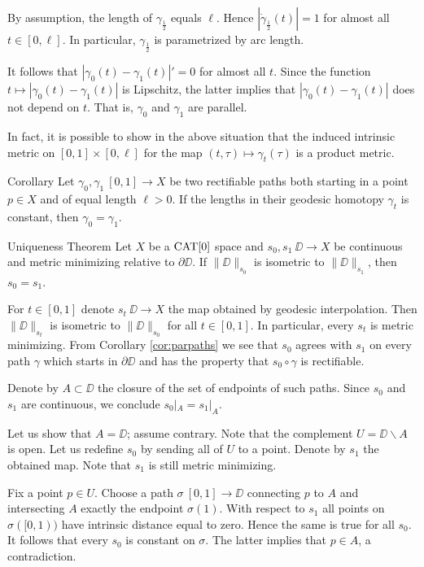 \documentclass{article}
\begin{document}
By assumption, the length of $\gamma_{\frac12}$ equals $\ell$. 
Hence $|\dot\gamma_{\frac12}(t)|=1$ for almost all $t\in[0,\ell]$. 
In particular, $\gamma_{\frac12}$
is parametrized by arc length. 

It follows that $|\gamma_{0}(t)-\gamma_{1}(t)|'=0$ for almost all $t$.
Since the function $t\mapsto |\gamma_{0}(t)-\gamma_{1}(t)|$ is Lipschitz,
the latter  implies that $|\gamma_{0}(t)-\gamma_{1}(t)|$ does not depend on $t$.
That is, $\gamma_{0}$ and $\gamma_{1}$ are parallel.
\qeds

In fact, it is possible to show in the above situation that the induced intrinsic metric on $[0,1]\times[0,\ell]$
for the map $(t,\tau)\mapsto \gamma_t(\tau)$ is a product metric.

\begin{thm}{Corollary}\label{cor:parpaths}
Let $\gamma_0,\gamma_1\:[0,1]\to X$ be two rectifiable paths both starting in a point $p\in X$ and of equal length $\ell>0$. 
If the lengths in their geodesic homotopy $\gamma_t$ is constant, then $\gamma_{0}=\gamma_{1}$.
\end{thm}

\begin{thm}{Uniqueness Theorem}\label{prop:strict-mm}
Let $X$ be a $\mathop{\rm CAT}\nolimits[0]$ space and $s_0, s_1\:\DD\to X$ be continuous and metric minimizing relative to $\partial\DD$. 
If 
$\|\DD\|_{s_0}$ is isometric to $\|\DD\|_{s_1}$, then $s_0=s_1$.
\end{thm}

For $t\in[0,1]$ denote $s_t\:\DD\to X$ the map obtained by geodesic interpolation. 
Then
$\|\DD\|_{s_t}$ is isometric to $\|\DD\|_{s_0}$ for all $t\in[0,1]$. 
In particular, every $s_t$ is metric minimizing.
From Corollary \ref{cor:parpaths} we see that $s_0$ agrees with $s_1$ on every path $\gamma$ which starts
in $\partial\DD$ and has the property that $s_0\circ\gamma$ is rectifiable. 

Denote by $A\subset\DD$ the closure of the set of endpoints of such paths. 
Since $s_0$ and $s_1$ are continuous, we conclude $s_0|_{A}=s_1|_{A}$.

Let us show that $A=\DD$; assume contrary.
Note that the complement $U=\DD\backslash A$ is open. 
Let us redefine $s_0$ by sending all of $U$ to a point.
Denote by $s_1$ the obtained map.
Note that $s_1$
is still metric minimizing.

Fix a point $p\in U$.
Choose a path $\sigma\:[0,1]\to\DD$ connecting $p$ to $A$ and intersecting $A$ exactly the endpoint $\sigma(1)$. 
With respect to $s_1$ all points on $\sigma([0,1))$ have intrinsic distance equal to zero.  
Hence the same is true for all $s_0$. 
It follows that every $s_0$ is constant on $\sigma$.
The latter implies that $p\in A$, a contradiction.
\qeds
\end{document}
